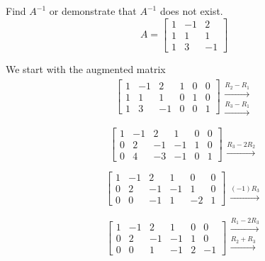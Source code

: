 \documentclass{ximera}
\begin{document}
\begin{example}\label{ex:inverse3} Find $A^{-1}$ or demonstrate that $A^{-1}$ does not exist.
$$A=\begin{bmatrix}1&-1&2\\1&1&1\\1&3&-1\end{bmatrix}$$
\begin{explanation}
We start with the augmented matrix
$$\left[\begin{array}{ccc|ccc}  
 1&-1&2&1&0&0\\1&1&1&0&1&0\\1&3&-1&0&0&1
 \end{array}\right]
  \begin{array}{c}
 \\
 \xrightarrow{R_2-R_1}\\
 \xrightarrow{R_3-R_1}
 \end{array}$$
 
  $$\left[\begin{array}{ccc|ccc}  
 1&-1&2&1&0&0\\0&2&-1&-1&1&0\\0&4&-3&-1&0&1
 \end{array}\right]
  \begin{array}{c}
 \\
 \\
 \xrightarrow{R_3-2R_2}
 \end{array}$$
 
 $$\left[\begin{array}{ccc|ccc}  
 1&-1&2&1&0&0\\0&2&-1&-1&1&0\\0&0&-1&1&-2&1
 \end{array}\right]
 \begin{array}{c}
 \\
 \\
 \xrightarrow{(-1)R_3}
 \end{array}$$
 
 $$\left[\begin{array}{ccc|ccc}  
 1&-1&2&1&0&0\\0&2&-1&-1&1&0\\0&0&1&-1&2&-1
 \end{array}\right]
 \begin{array}{c}
 \xrightarrow{R_1-2R_3}\\
 \xrightarrow{R_2+R_3}\\
\\
 \end{array}$$
 

\end{explanation}
\end{example}
\end{document}

